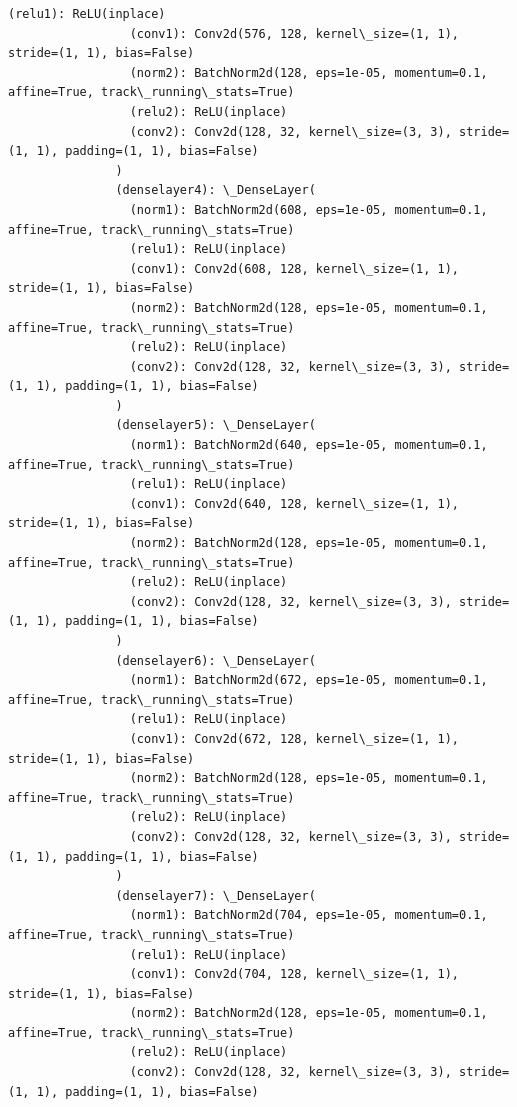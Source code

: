 \documentclass[11pt]{article}
\begin{document}
\begin{Verbatim}[commandchars=\\\{\}]
                 (relu1): ReLU(inplace)
                 (conv1): Conv2d(576, 128, kernel\_size=(1, 1), stride=(1, 1), bias=False)
                 (norm2): BatchNorm2d(128, eps=1e-05, momentum=0.1, affine=True, track\_running\_stats=True)
                 (relu2): ReLU(inplace)
                 (conv2): Conv2d(128, 32, kernel\_size=(3, 3), stride=(1, 1), padding=(1, 1), bias=False)
               )
               (denselayer4): \_DenseLayer(
                 (norm1): BatchNorm2d(608, eps=1e-05, momentum=0.1, affine=True, track\_running\_stats=True)
                 (relu1): ReLU(inplace)
                 (conv1): Conv2d(608, 128, kernel\_size=(1, 1), stride=(1, 1), bias=False)
                 (norm2): BatchNorm2d(128, eps=1e-05, momentum=0.1, affine=True, track\_running\_stats=True)
                 (relu2): ReLU(inplace)
                 (conv2): Conv2d(128, 32, kernel\_size=(3, 3), stride=(1, 1), padding=(1, 1), bias=False)
               )
               (denselayer5): \_DenseLayer(
                 (norm1): BatchNorm2d(640, eps=1e-05, momentum=0.1, affine=True, track\_running\_stats=True)
                 (relu1): ReLU(inplace)
                 (conv1): Conv2d(640, 128, kernel\_size=(1, 1), stride=(1, 1), bias=False)
                 (norm2): BatchNorm2d(128, eps=1e-05, momentum=0.1, affine=True, track\_running\_stats=True)
                 (relu2): ReLU(inplace)
                 (conv2): Conv2d(128, 32, kernel\_size=(3, 3), stride=(1, 1), padding=(1, 1), bias=False)
               )
               (denselayer6): \_DenseLayer(
                 (norm1): BatchNorm2d(672, eps=1e-05, momentum=0.1, affine=True, track\_running\_stats=True)
                 (relu1): ReLU(inplace)
                 (conv1): Conv2d(672, 128, kernel\_size=(1, 1), stride=(1, 1), bias=False)
                 (norm2): BatchNorm2d(128, eps=1e-05, momentum=0.1, affine=True, track\_running\_stats=True)
                 (relu2): ReLU(inplace)
                 (conv2): Conv2d(128, 32, kernel\_size=(3, 3), stride=(1, 1), padding=(1, 1), bias=False)
               )
               (denselayer7): \_DenseLayer(
                 (norm1): BatchNorm2d(704, eps=1e-05, momentum=0.1, affine=True, track\_running\_stats=True)
                 (relu1): ReLU(inplace)
                 (conv1): Conv2d(704, 128, kernel\_size=(1, 1), stride=(1, 1), bias=False)
                 (norm2): BatchNorm2d(128, eps=1e-05, momentum=0.1, affine=True, track\_running\_stats=True)
                 (relu2): ReLU(inplace)
                 (conv2): Conv2d(128, 32, kernel\_size=(3, 3), stride=(1, 1), padding=(1, 1), bias=False)

\end{Verbatim}
\end{document}

